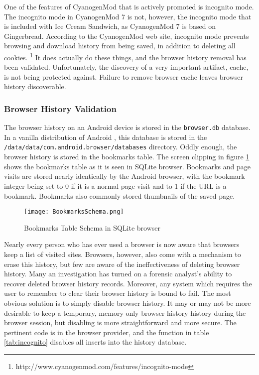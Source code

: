One of the features of CyanogenMod that is actively promoted is incognito mode. The incognito mode in CyanogenMod 7 is not, however,
the incognito mode that is included with Ice Cream Sandwich, as CyanogenMod 7 is based on Gingerbread. According to the CyanogenMod
web site, incognito mode prevents browsing and download history from being saved, in addition to deleting all cookies.
\footnote{http://www.cyanogenmod.com/features/incognito-mode} It does actually do these things, and the browser history removal has
been validated.  Unfortunately, the discovery of a very important artifact, cache, is not being protected against. Failure to remove
browser cache leaves browser history discoverable.

\subsubsection{Browser History Validation}

The browser history on an Android device is stored in the \texttt{browser.db} database.  In a vanilla distribution of Android , this
database is stored in the \texttt{/data/data/com.android.browser/databases} directory.  Oddly enough, the browser history is stored
in the bookmarks table.  The screen clipping in figure \ref{fig:bookmarkschema} shows the bookmarks table as it is seen in SQLite
browser.  Bookmarks and page visits are stored nearly identically by the Android browser, with the bookmark integer being set to 0
if it is a normal page visit and to 1 if the URL is a bookmark.  Bookmarks also commonly stored thumbnails of the saved page.
\begin{figure}
\texttt{[image: BookmarksSchema.png]}
\caption{Bookmarks Table Schema in SQLite browser}
\label{fig:bookmarkschema}
\end{figure}

Nearly every person who has ever used a browser is now aware that browsers keep a list of visited sites.  Browsers, however, also
come with a mechanism to erase this history, but few are aware of the ineffectiveness of deleting browser history.  Many an
investigation has turned on a forensic analyst's ability to recover deleted browser history records.  Moreover, any system which
requires the user to remember to clear their browser history is bound to fail.  The most obvious solution is to simply disable
browser history.  It may or may not be more desirable to keep a temporary, memory-only browser history history during the browser
session, but disabling is more straightforward and more secure.  The pertinent code is in the browser provider, and the function in
table \ref{tab:incognito} disables all inserts into the history database.

